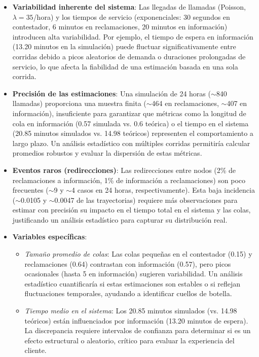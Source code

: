 \documentclass[12pt]{article}
\begin{document}
\begin{itemize}
    \item \textbf{Variabilidad inherente del sistema}: Las llegadas de llamadas (Poisson, $\lambda = 35$/hora) y los tiempos de servicio (exponenciales: 30 segundos en contestador, 6 minutos en reclamaciones, 20 minutos en información) introducen alta variabilidad. Por ejemplo, el tiempo de espera en información (13.20 minutos en la simulación) puede fluctuar significativamente entre corridas debido a picos aleatorios de demanda o duraciones prolongadas de servicio, lo que afecta la fiabilidad de una estimación basada en una sola corrida.
    
    \item \textbf{Precisión de las estimaciones}: Una simulación de 24 horas ($\sim$840 llamadas) proporciona una muestra finita ($\sim$464 en reclamaciones, $\sim$407 en información), insuficiente para garantizar que métricas como la longitud de cola en información (0.57 simulada vs. 0.6 teórica) o el tiempo en el sistema (20.85 minutos simulados vs. 14.98 teóricos) representen el comportamiento a largo plazo. Un análisis estadístico con múltiples corridas permitiría calcular promedios robustos y evaluar la dispersión de estas métricas.
    
    \item \textbf{Eventos raros (redirecciones)}: Las redirecciones entre nodos (2\% de reclamaciones a información, 1\% de información a reclamaciones) son poco frecuentes ($\sim$9 y $\sim$4 casos en 24 horas, respectivamente). Esta baja incidencia ($\sim$0.0105 y $\sim$0.0047 de las trayectorias) requiere más observaciones para estimar con precisión su impacto en el tiempo total en el sistema y las colas, justificando un análisis estadístico para capturar su distribución real.
    
    \item \textbf{Variables específicas}:
    \begin{itemize}
        \item \textit{Tamaño promedio de colas}: Las colas pequeñas en el contestador (0.15) y reclamaciones (0.64) contrastan con información (0.57), pero picos ocasionales (hasta 5 en información) sugieren variabilidad. Un análisis estadístico cuantificaría si estas estimaciones son estables o si reflejan fluctuaciones temporales, ayudando a identificar cuellos de botella.
        
        \item \textit{Tiempo medio en el sistema}: Los 20.85 minutos simulados (vs. 14.98 teóricos) están influenciados por información (13.20 minutos de espera). La discrepancia requiere intervalos de confianza para determinar si es un efecto estructural o aleatorio, crítico para evaluar la experiencia del cliente.
        

\end{itemize}
\end{itemize}
\end{document}
